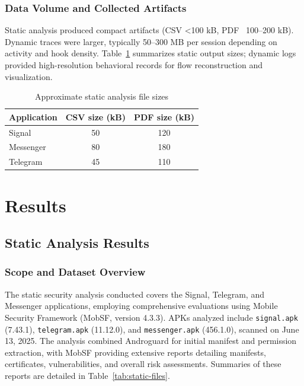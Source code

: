 \documentclass[a4paper,12pt]{report}
\begin{document}
\subsection{Data Volume and Collected Artifacts}
Static analysis produced compact artifacts (CSV <100 kB, PDF ~100–200 kB). Dynamic traces were larger, typically 50–300 MB per session depending on activity and hook density. Table~\ref{tab:static-sizes} summarizes static output sizes; dynamic logs provided high-resolution behavioral records for flow reconstruction and visualization.

\begin{table}[H]
\centering
\begin{tabular}{|l|c|c|}
\hline
\textbf{Application} & \textbf{CSV size (kB)} & \textbf{PDF size (kB)} \\
\hline
Signal & 50 & 120 \\
Messenger & 80 & 180 \\
Telegram & 45 & 110 \\
\hline
\end{tabular}
\caption{Approximate static analysis file sizes}
\label{tab:static-sizes}
\end{table}


\chapter{Results}

\section{Static Analysis Results}

\subsection{Scope and Dataset Overview}
The static security analysis conducted covers the Signal, Telegram, and Messenger applications, employing comprehensive evaluations using Mobile Security Framework (MobSF, version 4.3.3). APKs analyzed include \texttt{signal.apk} (7.43.1), \texttt{telegram.apk} (11.12.0), and \texttt{messenger.apk} (456.1.0), scanned on June 13, 2025. The analysis combined Androguard for initial manifest and permission extraction, with MobSF providing extensive reports detailing manifests, certificates, vulnerabilities, and overall risk assessments. Summaries of these reports are detailed in Table~\ref{tab:static-files}.
\end{document}

